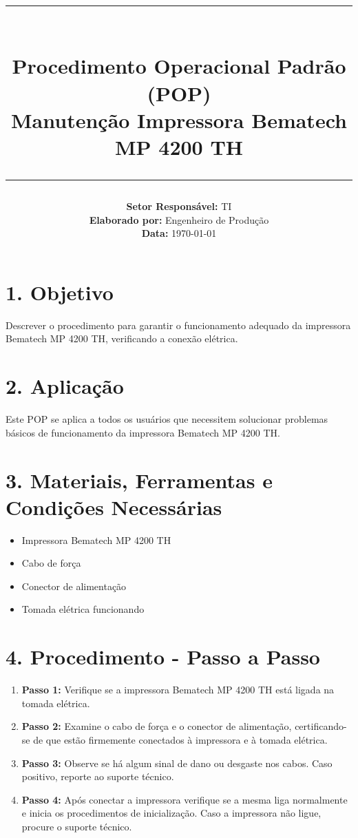 \documentclass[a4paper,12pt]{article}
\title{
    \vspace{-2cm}
    \rule{\linewidth}{0.5mm}\\[0.4cm]
    \textbf{Procedimento Operacional Padrão (POP)}\\[0.2cm]
    \textbf{Manutenção Impressora Bematech MP 4200 TH}\\[0.2cm]
    \rule{\linewidth}{0.5mm}
}
\author{
    \textbf{Setor Responsável:} TI \\
    \textbf{Elaborado por:} Engenheiro de Produção \\
    \textbf{Data:} \today
}
\date{}
\begin{document}
\maketitle
\vspace{-1cm}

\section*{1. Objetivo}
Descrever o procedimento para garantir o funcionamento adequado da impressora Bematech MP 4200 TH, verificando a conexão elétrica.

\section*{2. Aplicação}
Este POP se aplica a todos os usuários que necessitem solucionar problemas básicos de funcionamento da impressora Bematech MP 4200 TH.

\section*{3. Materiais, Ferramentas e Condições Necessárias}
\begin{itemize}
    \item Impressora Bematech MP 4200 TH
    \item Cabo de força
    \item Conector de alimentação
    \item Tomada elétrica funcionando
\end{itemize}

\section*{4. Procedimento - Passo a Passo}
\begin{enumerate}
    \item \textbf{Passo 1:} Verifique se a impressora Bematech MP 4200 TH está ligada na tomada elétrica.
    \item \textbf{Passo 2:} Examine o cabo de força e o conector de alimentação, certificando-se de que estão firmemente conectados à impressora e à tomada elétrica.
    \item \textbf{Passo 3:} Observe se há algum sinal de dano ou desgaste nos cabos. Caso positivo, reporte ao suporte técnico.
    \item \textbf{Passo 4:} Após conectar a impressora verifique se a mesma liga normalmente e inicia os procedimentos de inicialização. Caso a impressora não ligue, procure o suporte técnico.
\end{enumerate}
\end{document}
